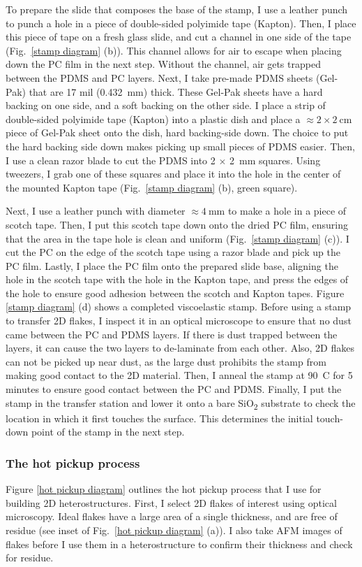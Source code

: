 \documentclass[double,12pt,1in,seploa]{beavtex}
\let\Oldsubsubsection\subsubsection
\renewcommand{\subsubsection}{\FloatBarrier\Oldsubsubsection}
\begin{document}
To prepare the slide that composes the base of the stamp, I use a leather punch to punch a hole in a piece of double-sided polyimide tape (Kapton). Then, I place this piece of tape on a fresh glass slide, and cut a channel in one side of the tape (Fig.\ \ref{stamp diagram} (b)). This channel allows for air to escape when placing down the PC film in the next step. Without the channel, air gets trapped between the PDMS and PC layers. Next, I take pre-made PDMS sheets (Gel-Pak) that are 17 mil (\SI{0.432}{\milli\meter}) thick. These Gel-Pak sheets have a hard backing on one side, and a soft backing on the other side. I place a strip of double-sided polyimide tape (Kapton) into a plastic dish and place a $\approx 2 \times \SI{2}{\centi\meter}$ piece of Gel-Pak sheet onto the dish, hard backing-side down. The choice to put the hard backing side down makes picking up small pieces of PDMS easier. Then, I use a clean razor blade to cut the PDMS into 2 $\times$ \SI{2}{mm} squares. Using tweezers, I grab one of these squares and place it into the hole in the center of the mounted Kapton tape (Fig.\ \ref{stamp diagram} (b), green square).

Next, I use a leather punch with diameter $\approx  \SI{4}{\milli\meter}$ to make a hole in a piece of scotch tape. Then, I put this scotch tape down onto the dried PC film, ensuring that the area in the tape hole is clean and uniform (Fig.\ \ref{stamp diagram} (c)). I cut the PC on the edge of the scotch tape using a razor blade and pick up the PC film. Lastly, I place the PC film onto the prepared slide base, aligning the hole in the scotch tape with the hole in the Kapton tape, and press the edges of the hole to ensure good adhesion between the scotch and Kapton tapes. Figure \ref{stamp diagram} (d) shows a completed viscoelastic stamp. Before using a stamp to transfer 2D flakes, I inspect it in an optical microscope to ensure that no dust came between the PC and PDMS layers. If there is dust trapped between the layers, it can cause the two layers to de-laminate from each other. Also, 2D flakes can not be picked up near dust, as the large dust prohibits the stamp from making good contact to the 2D material. Then, I anneal the stamp at \SI{90}{C} for 5 minutes to ensure good contact between the PC and PDMS. Finally, I put the stamp in the transfer station and lower it onto a bare SiO\textsubscript{2} substrate to check the location in which it first touches the surface. This determines the initial touch-down point of the stamp in the next step.


\subsubsection{The hot pickup process} \label{the hot pickup proces}
Figure \ref{hot pickup diagram} outlines the hot pickup process that I use for building 2D heterostructures. First, I select 2D flakes of interest using optical microscopy. Ideal flakes have a large area of a single thickness, and are free of residue (see inset of Fig.\ \ref{hot pickup diagram} (a)). I also take AFM images of flakes before I use them in a heterostructure to confirm their thickness and check for residue. 
\end{document}
